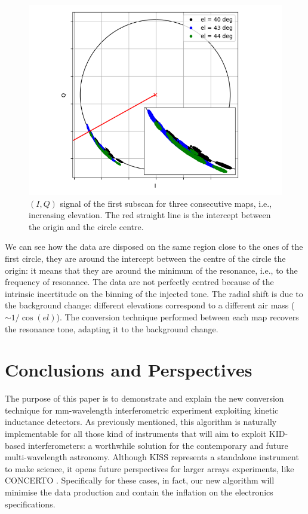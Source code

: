 \documentclass[twocolumn,traditabstract]{aa}\\
\begin{document}
\begin{figure}[htf]
	\centering
	\includegraphics[width=.5\textwidth]{4.results/autotuning.png}
	\caption{$(I,Q)$ signal of the first subscan for three consecutive maps, i.e., increasing elevation. The red straight line is the intercept between the origin and the circle centre.}
	\label{fig:autotuning}
\end{figure}

\noindent We can see how the data are disposed on the same region close to the ones of the first circle, they are around the intercept between the centre of the circle the origin: it means that they are around the minimum of the resonance, i.e., to the frequency of resonance. The data are not perfectly centred because of the intrinsic incertitude on the binning of the injected tone. The radial shift is due to the background change: different elevations correspond to a different air mass ($\sim 1/\cos(el)$). The conversion technique performed between each map recovers the resonance tone, adapting it to the background change.

\section{Conclusions and Perspectives}
\label{sec:conclu}
The purpose of this paper is to demonstrate and explain the new conversion technique for mm-wavelength interferometric experiment exploiting kinetic inductance detectors. As previously mentioned, this algorithm is naturally implementable for all those kind of instruments that will aim to exploit KID-based interferometers: a worthwhile solution for the contemporary and future multi-wavelength astronomy. Although KISS represents a standalone instrument to make science, it opens future perspectives for larger arrays experiments, like CONCERTO \cite{concerto}. Specifically for these cases, in fact, our new algorithm will minimise the data production and contain the inflation on the electronics specifications.


\end{document}
